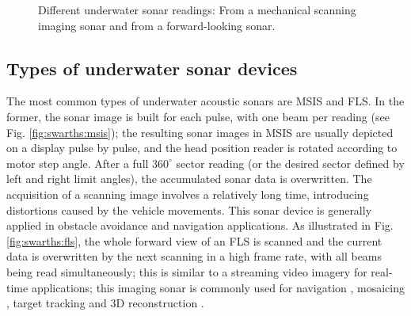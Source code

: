 \documentclass[final,5p,times]{elsarticle}
\begin{document}
\begin{figure}[t]
    \centering
    \caption{Different underwater sonar readings: 
    From a mechanical scanning imaging sonar and 
    from a forward-looking sonar.}
    \captionsetup{justification=justified}
    \label{fig:sonar_devices}
\end{figure}

\subsection{Types of underwater sonar devices}
\label{sonar:devices}

The most common types of underwater acoustic sonars are MSIS and FLS. In
the former, the sonar image is built for each pulse, with one beam per
reading (see Fig. \ref{fig:swarths:msis}); the resulting sonar images in MSIS are usually depicted on a display pulse by pulse, and the head position reader is rotated according to motor step angle. After a full $360^{\circ}$ sector reading (or the desired sector defined by left and right limit angles), the accumulated sonar data is overwritten. The acquisition of a scanning image involves a relatively long time, introducing distortions caused by the vehicle movements. This sonar device is generally applied in obstacle avoidance \cite{ganesan2015} and navigation \cite{ribas2010} applications. As illustrated in Fig. \ref{fig:swarths:fls}, the whole forward view of an FLS is scanned and the current data is overwritten by the next scanning in a high frame rate, with all beams being read simultaneously; this is similar to a streaming video imagery for real-time applications; this imaging sonar is commonly used for navigation \cite{fallon2013}, mosaicing \cite{hurtos2014}, target tracking \cite{liu2016} and 3D reconstruction \cite{huang2015a}.
\end{document}
